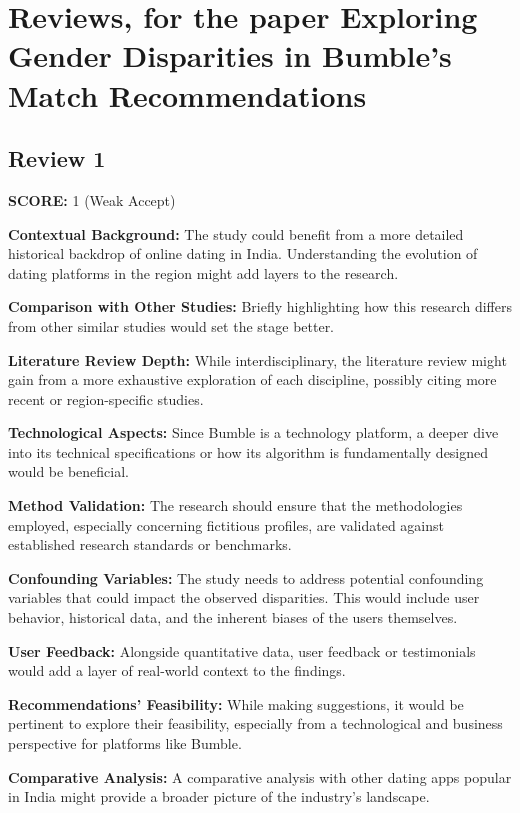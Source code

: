 \section*{Reviews, for the paper Exploring Gender Disparities in Bumble's Match Recommendations}
\subsection*{Review 1}

\textbf{SCORE:} 1 (Weak Accept)

\textbf{Contextual Background:} The study could benefit from a more detailed historical backdrop of online dating in India. Understanding the evolution of dating platforms in the region might add layers to the research.

\textbf{Comparison with Other Studies:} Briefly highlighting how this research differs from other similar studies would set the stage better.

\textbf{Literature Review Depth:} While interdisciplinary, the literature review might gain from a more exhaustive exploration of each discipline, possibly citing more recent or region-specific studies.

\textbf{Technological Aspects:} Since Bumble is a technology platform, a deeper dive into its technical specifications or how its algorithm is fundamentally designed would be beneficial.

\textbf{Method Validation:} The research should ensure that the methodologies employed, especially concerning fictitious profiles, are validated against established research standards or benchmarks.

\textbf{Confounding Variables:} The study needs to address potential confounding variables that could impact the observed disparities. This would include user behavior, historical data, and the inherent biases of the users themselves.

\textbf{User Feedback:} Alongside quantitative data, user feedback or testimonials would add a layer of real-world context to the findings.

\textbf{Recommendations' Feasibility:} While making suggestions, it would be pertinent to explore their feasibility, especially from a technological and business perspective for platforms like Bumble.

\textbf{Comparative Analysis:} A comparative analysis with other dating apps popular in India might provide a broader picture of the industry's landscape.

